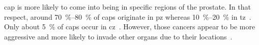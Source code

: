 \ac{cap} is more likely to come into being in specific regions of the prostate.
In that respect, around \SIrange{70}{80}{\percent} of \acp{cap} originate in \ac{pz} whereas \SIrange{10}{20}{\percent} in \ac{tz}~\cite{Carrol1987,McNeal1988,Stamey1998}.
Only about \SI{5}{\percent} of \acp{cap} occur in \ac{cz}~\cite{McNeal1988,Cohen2008}.
However, those cancers appear to be more aggressive and more likely to invade other organs due to their locations~\cite{Cohen2008}.









